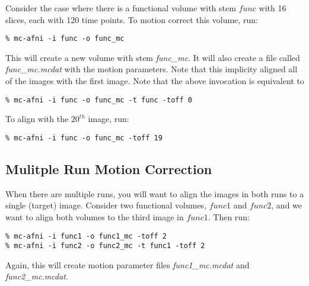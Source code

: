 \documentclass[10pt]{article}
\begin{document}
Consider the case where there is a functional volume with stem
$func$ with 16 slices, each with 120 time points.  To motion correct
this volume, run:
\begin{verbatim}
% mc-afni -i func -o func_mc
\end{verbatim}
This will create a new volume with stem {\em func\_mc}.  It will also
create a file called {\em func\_mc.mcdat} with the motion parameters.
Note that this implicity aligned all of the images with the first
image.  Note that the above invocation is equivalent to 
\begin{verbatim}
% mc-afni -i func -o func_mc -t func -toff 0
\end{verbatim}
To align with the $20^{th}$ image, run:
\begin{verbatim}
% mc-afni -i func -o func_mc -toff 19
\end{verbatim}

\subsection{Mulitple Run Motion Correction}

When there are multiple runs, you will want to align the images in
both runs to a single (target) image.  Consider two functional
volumes, $func1$ and $func2$, and we want to align both volumes to the
third image in $func1$.  Then run:
\begin{verbatim}
% mc-afni -i func1 -o func1_mc -toff 2
% mc-afni -i func2 -o func2_mc -t func1 -toff 2
\end{verbatim}
Again, this will create motion parameter files {\em func1\_mc.mcdat}
and {\em func2\_mc.mcdat}.
\end{document}
